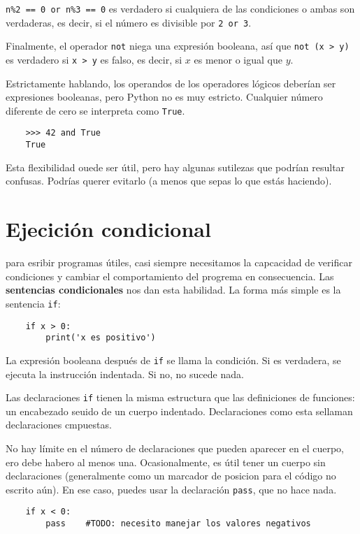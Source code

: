 \texttt{n\%2 == 0 or n\%3 == 0} es verdadero si cualquiera de las condiciones o ambas son verdaderas, es decir, si el número es divisible por \texttt{2 or 3}.

Finalmente, el operador \texttt{not} niega una expresión booleana, así que \texttt{not (x > y)} es verdadero si \texttt{x > y} es falso, es decir, si $x$ es menor o igual que $y$.

Estrictamente hablando, los operandos de los operadores lógicos deberían ser expresiones booleanas, pero Python no es muy estricto. Cualquier número diferente de cero se interpreta como \texttt{True}.

\begin{lstlisting}
    >>> 42 and True
    True
\end{lstlisting}

Esta flexibilidad ouede ser útil, pero hay algunas sutilezas que podrían resultar confusas. Podrías querer evitarlo (a menos que sepas lo que estás haciendo).

\section{Ejecición condicional}
para esribir programas útiles, casi siempre necesitamos la capcacidad de verificar condiciones y cambiar el comportamiento del progrema en consecuencia. Las \textbf{sentencias condicionales} nos dan esta habilidad. La forma más simple es la sentencia \texttt{if}:

\begin{lstlisting}
    if x > 0:
        print('x es positivo')
\end{lstlisting}

La expresión booleana después de \texttt{if} se llama la condición. Si es verdadera, se ejecuta la instrucción indentada. Si no, no sucede nada.

Las declaraciones \texttt{if} tienen la misma estructura que las definiciones de funciones: un encabezado seuido de un cuerpo indentado. Declaraciones como esta sellaman declaraciones cmpuestas.

No hay límite en el número de declaraciones que pueden aparecer en el cuerpo, ero debe habero al menos una. Ocasionalmente, es útil tener un cuerpo sin declaraciones (generalmente como un marcador de posicion para el código no escrito aún). En ese caso, puedes usar la declaración \texttt{pass}, que no hace nada.

\begin{lstlisting}
    if x < 0:
        pass    #TODO: necesito manejar los valores negativos
\end{lstlisting}

